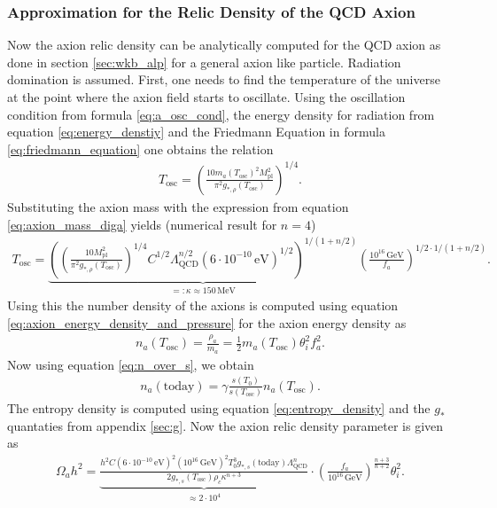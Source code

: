 \documentclass[twoside,a4paper, 12pt]{article}
\numberwithin{equation}{section}
\begin{document}
\subsubsection{Approximation for the Relic Density of the QCD Axion}
\label{sec:wkb_qcd}
Now the axion relic density can be analytically computed for the QCD axion as done
in section \ref{sec:wkb_alp} for a general axion like particle. Radiation domination is assumed.
First, one needs to find the temperature of the universe at the point where the
axion field starts to oscillate.
Using the oscillation condition from formula \eqref{eq:a_osc_cond},
the energy density for radiation from equation \eqref{eq:energy_denstiy} and the Friedmann Equation in formula \eqref{eq:friedmann_equation}
one obtains the relation
\begin{align*}
    T_\mathrm{osc} = \left( \frac{10 m_a(T_\mathrm{osc})^2 M_\mathrm{pl}^2}{\pi^2 g_{*, \rho}(T_\mathrm{osc})} \right)^{1/4}.
\end{align*}
Substituting the axion mass with the expression from equation \eqref{eq:axion_mass_diga} yields (numerical result for $n = 4$)
\begin{align}
    \label{eq:T_osc1}
    T_\mathrm{osc} = \underbrace{\left( \left( \frac{10 M_\mathrm{pl}^2}{\pi^2 g_{*, \rho}(T_\mathrm{osc})} \right)^{1/4} C^{1/2} \Lambda_\mathrm{QCD}^{n/2} (6 \cdot 10^{-10} \, \mathrm{eV})^{1/2} \right)^{1/(1 + n/2)} }_{=: \kappa \approx 150 \, \mathrm{MeV} } \left( \frac{10^{16} \, \mathrm{GeV}}{f_a} \right)^{1/2 \cdot 1/(1 + n/2)}.
\end{align}
Using this the number density of the axions is computed using equation \eqref{eq:axion_energy_density_and_pressure} for the axion energy density as
\begin{align*}
    n_a(T_\mathrm{osc}) = \frac{\rho_a}{m_a} = \frac{1}{2} m_a(T_\mathrm{osc}) \theta_i^2 f_a^2.
\end{align*}
Now using equation \eqref{eq:n_over_s},
we obtain
\begin{align*}
    n_a(\mathrm{today}) = \gamma \frac{s(T_0)}{s(T_\mathrm{osc})} n_a(T_\mathrm{osc}).
\end{align*}
The entropy density is computed using equation \eqref{eq:entropy_density}
and the $g_*$ quantaties from appendix \ref{sec:g}.
Now the axion relic density parameter is given as
\begin{align}
    \label{eq:relic_density_high_temp}
    \Omega_a h^2 = \underbrace{
    \frac{h^2 C (6 \cdot 10^{-10} \, \mathrm{eV})^2 (10^{16} \, \mathrm{GeV})^2 T_0^3 g_{*, s}(\mathrm{today}) \Lambda_\mathrm{QCD}^n}{2 g_{*, s}(T_\mathrm{osc}) \rho_c \kappa^{n + 3}}
    }_{\approx 2 \cdot 10^4} \cdot \left( \frac{f_a}{10^{16} \, \mathrm{GeV}}\right) ^ {\frac{n + 3}{n + 2}} \theta_i^2.
\end{align}
\end{document}
